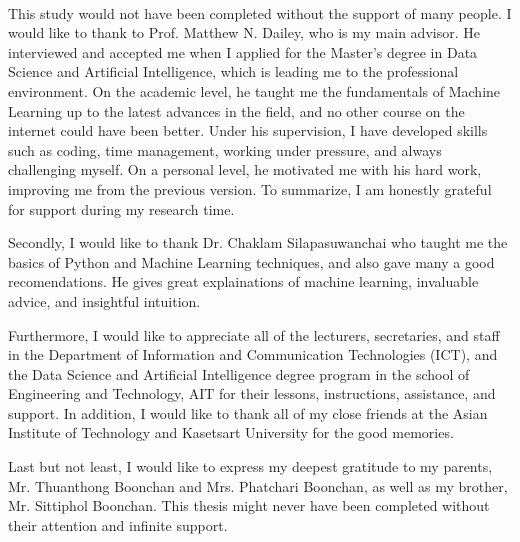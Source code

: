 
\setlength{\parindent}{0in}
\setlength{\parskip}{1em}
\setlength{\baselineskip}{1.6em}

\begin{center}
  \fontsize{14}{17} \\
\end{center}
\vspace{36pt}

This study would not have been completed without the support of many people. I would like to thank to Prof. Matthew N. Dailey, who is my main advisor. He interviewed and accepted me when I applied for the Master's degree in Data Science and Artificial Intelligence, which is leading me to the professional environment. On the academic level, he taught me the fundamentals of Machine Learning up to the latest advances in the field, and no other course on the internet could have been better. Under his supervision, I have developed skills such as coding, time management, working under pressure, and always challenging myself. On a personal level, he motivated me with his hard work, improving me from the previous version. To summarize, I am honestly grateful for support during my research time.

Secondly, I would like to thank Dr. Chaklam Silapasuwanchai who taught me the basics of Python and Machine Learning techniques, and also gave many a good recomendations. He gives great explainations of machine learning, invaluable advice, and insightful intuition.

Furthermore, I would like to appreciate all of the lecturers, secretaries, and staff in the Department of Information and Communication Technologies (ICT), and the Data Science and Artificial Intelligence degree program in the school of Engineering and Technology, AIT for their lessons, instructions, assistance, and support. In addition, I would like to thank all of my close friends at the Asian Institute of Technology and Kasetsart University for the good memories.

Last but not least, I would like to express my deepest gratitude to my parents, Mr. Thuanthong Boonchan and Mrs. Phatchari Boonchan, as well as my brother, Mr. Sittiphol Boonchan. This thesis might never have been completed without their attention and infinite support.